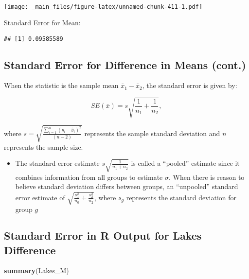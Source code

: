 \documentclass[]{book}
\newenvironment{Shaded}{\begin{snugshade}}{\end{snugshade}}
\newcommand{\KeywordTok}[1]{\textcolor[rgb]{0.13,0.29,0.53}{\textbf{#1}}}
\newcommand{\StringTok}[1]{\textcolor[rgb]{0.31,0.60,0.02}{#1}}
\newcommand{\OperatorTok}[1]{\textcolor[rgb]{0.81,0.36,0.00}{\textbf{#1}}}
\newcommand{\NormalTok}[1]{#1}
\providecommand{\tightlist}{%
  \setlength{\itemsep}{0pt}\setlength{\parskip}{0pt}}
\begin{document}
\texttt{[image: \_main\_files/figure-latex/unnamed-chunk-411-1.pdf]}

Standard Error for Mean:

\begin{Shaded}
\end{Shaded}

\begin{verbatim}
## [1] 0.09585589
\end{verbatim}

\subsection{Standard Error for Difference in Means
(cont.)}\label{standard-error-for-difference-in-means-cont.}

When the statistic is the sample mean \(\bar{x}_1-\bar{x}_2\), the
standard error is given by:

\[
SE(\bar{x})=s\sqrt{\frac{1}{n_1}+\frac{1}{n_2}}, 
\]

where
\(s=\sqrt{\frac{\displaystyle\sum_{i=1}^n(y_i-\hat{y}_i)^2}{(n-2)}}\)
represents the sample standard deviation and \(n\) represents the sample
size.

\begin{itemize}
\tightlist
\item
  The standard error estimate \(s\sqrt{\frac{1}{n_1+n_2}}\) is called a
  ``pooled'' estimate since it combines information from all groups to
  estimate \(\sigma\). When there is reason to believe standard
  deviation differs between groups, an ``unpooled'' standard error
  estimate of \(\sqrt{\frac{s_1^2}{n_0}+\frac{s_2^2}{n_2}}\), where
  \(s_g\) represents the standard deviation for group \(g\)
\end{itemize}

\subsection{Standard Error in R Output for Lakes
Difference}\label{standard-error-in-r-output-for-lakes-difference}

\begin{Shaded}
\begin{Highlighting}[]
\KeywordTok{summary}\NormalTok{(Lakes_M)}
\end{Highlighting}
\end{Shaded}
\end{document}
